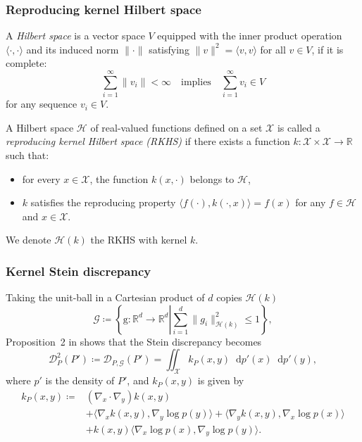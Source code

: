 \documentclass{beamer}
\newcommand*\diff{\mathop{}\!\mathrm{d}}
\begin{document}
\begin{frame}
\frametitle{Reproducing kernel Hilbert space}

A \textit{Hilbert space} is a vector space $V$ equipped with the inner product operation $\langle \cdot, \cdot \rangle$ and its induced norm $\|\cdot\|$ satisfying $\|v\|^2 = \langle v, v \rangle$ for all $v \in V$, if it is complete:
\begin{equation*}
\sum_{i=1}^\infty \|v_i\| < \infty \quad \text{implies} \quad \sum_{i=1}^\infty v_i \in V
\end{equation*}
for any sequence $v_i \in V$.

A Hilbert space $\mathcal{H}$ of real-valued functions defined on a set $\mathcal{X}$ is called a \textit{reproducing kernel Hilbert space (RKHS)} if there exists a function $k: \mathcal{X} \times \mathcal{X} \to \mathbb{R}$ such that:
\begin{itemize}
\item for every $x \in \mathcal{X}$, the function $k(x, \cdot)$ belongs to $\mathcal{H}$,
\item $k$ satisfies the reproducing property $\langle f(\cdot), k(\cdot, x)\rangle = f(x)$ for any $f \in \mathcal{H}$ and $x \in \mathcal{X}$.
\end{itemize}

We denote $\mathcal{H}(k)$ the RKHS with kernel $k$.

\end{frame}



\begin{frame}
\frametitle{Kernel Stein discrepancy}

Taking the unit-ball in a Cartesian product of $d$ copies $\mathcal{H}(k)$
\begin{equation*}
\mathcal{G} \coloneq \left\{ \mathrm{g} : \mathbb{R}^d \to \mathbb{R}^d \left| \sum_{i=1}^d \|g_i\|^2_{\mathcal{H}(k)} \leq 1 \right.\right\},
\label{eq:unit-ball}
\end{equation*}
Proposition~2 in \cite{gorhamMeasuringSampleQuality2017} shows that the Stein discrepancy becomes
\begin{equation*}
\mathcal{D}_{P}^2(P') \coloneq \mathcal{D}_{P, \mathcal{G}}(P') = \iint_\mathcal{X} k_P(x, y) \diff p'(x) \diff p'(y),
\label{eq:stein-discrepancy-sqrt-expectation}
\end{equation*}
where $p'$ is the density of $P'$, and $k_P(x, y)$ is given by
\begin{equation*}
\begin{aligned}
k_P(x, y) \coloneq 
&(\nabla_x\cdot\nabla_y) k(x,y) \\
&+ \langle \nabla_x k(x, y), \nabla_y \log p(y) \rangle + \langle \nabla_y k(x, y), \nabla_x \log p(x) \rangle \\
&+ k(x, y) \langle \nabla_x \log p(x), \nabla_y \log p(y) \rangle.
\end{aligned}
\end{equation*}

\end{frame}
\end{document}
